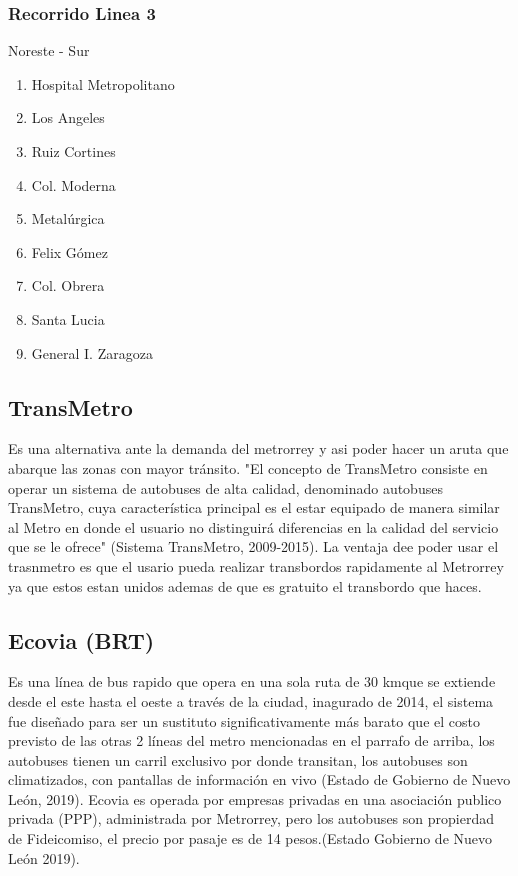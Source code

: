 \documentclass[a4paper]{article}
\begin{document}
\autocite{LineasMetro}

\subsubsection{Recorrido Linea 3}
Noreste - Sur
\begin{enumerate}
\item Hospital Metropolitano
\item Los Angeles
\item Ruiz Cortines
\item Col. Moderna
\item Metalúrgica
\item Felix Gómez
\item Col. Obrera
\item Santa Lucia
\item General I. Zaragoza
\end{enumerate}

\autocite{LineasMetro}

\subsection{TransMetro}
Es una alternativa ante la demanda del metrorrey y asi poder hacer un aruta que abarque las zonas con mayor tránsito. "El concepto de TransMetro consiste en operar un sistema de autobuses de alta calidad, denominado autobuses TransMetro, cuya característica principal es el estar equipado de manera similar al Metro en donde el usuario no distinguirá diferencias en la calidad del servicio que se le ofrece" (Sistema TransMetro, 2009-2015). La ventaja dee poder usar el trasnmetro es que el usario pueda realizar transbordos rapidamente al Metrorrey ya que estos estan unidos ademas de que es gratuito el transbordo que haces.

\autocite{TEC1}

\subsection{Ecovia (BRT)}
Es una línea de bus rapido que opera en una sola ruta de 30 kmque se extiende desde el este hasta el oeste a través de la ciudad, inagurado de 2014, el sistema fue diseñado para ser un sustituto significativamente más barato que  el costo previsto de las otras 2 líneas del metro mencionadas en el parrafo de arriba, los autobuses tienen un carril exclusivo por donde transitan, los autobuses son climatizados, con pantallas de información en vivo (Estado de Gobierno de Nuevo León, 2019).
Ecovia es operada por empresas privadas en una asociación publico privada (PPP), administrada por Metrorrey,  pero los autobuses son propierdad de Fideicomiso, el precio por pasaje es de 14 pesos.(Estado Gobierno de Nuevo León 2019).
\end{document}
